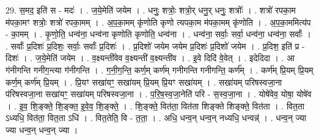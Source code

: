 \documentclass[17pt]{extarticle}
\begin{document}
29. स॒मद॒ इति॑ स - मदः॑ । . ज॒ये॒मेति॑ जयेम । . धनुः॒ शत्रोः॒ शत्रो॒र् धनु॒र् धनुः॒ शत्रोः᳚ । . शत्रो॑ रपका॒म म॑पका॒मꣳ शत्रोः॒ शत्रो॑ रपका॒मम् । . अ॒प॒का॒मम् कृ॑णोति कृणो त्यपका॒म म॑पका॒मम् कृ॑णोति । . अ॒प॒का॒ममित्य॑प - का॒मम् । . कृ॒णो॒ति॒ धन्व॑ना॒ धन्व॑ना कृणोति कृणोति॒ धन्व॑ना । . धन्व॑ना॒ सर्वाः॒ सर्वा॒ धन्व॑ना॒ धन्व॑ना॒ सर्वाः᳚ । . सर्वाः᳚ प्र॒दिशः॑ प्र॒दिशः॒ सर्वाः॒ सर्वाः᳚ प्र॒दिशः॑ । . प्र॒दिशो॑ जयेम जयेम प्र॒दिशः॑ प्र॒दिशो॑ जयेम । . प्र॒दिश॒ इति॑ प्र - दिशः॑ । . ज॒ये॒मेति॑ जयेम । . व॒क्ष्यन्ती॑वेव व॒क्ष्यन्ती॑ व॒क्ष्यन्ती॑व । . इ॒वे दिदि॑ वे॒वेत् । . इदेदिदा । . आ ग॑नीगन्ति गनीग॒न्त्या ग॑नीगन्ति । . ग॒नी॒ग॒न्ति॒ कर्ण॒म् कर्ण॑म् गनीगन्ति गनीगन्ति॒ कर्ण᳚म् । . कर्ण॑म् प्रि॒यम् प्रि॒यम् कर्ण॒म् कर्ण॑म् प्रि॒यम् । . प्रि॒यꣳ सखा॑यꣳ॒॒ सखा॑यम् प्रि॒यम् प्रि॒यꣳ सखा॑यम् । . सखा॑यम् परिषस्वजा॒ना प॑रिषस्वजा॒ना सखा॑यꣳ॒॒ सखा॑यम् परिषस्वजा॒ना । . प॒रि॒ष॒स्व॒जा॒नेति॑ परि - स॒स्व॒जा॒ना । . योषे॑वेव॒ योषा॒ योषे॑व । . इ॒व॒ शि॒ङ्क्ते॒ शि॒ङ्क्त॒ इ॒वे॒व॒ शि॒ङ्क्ते॒ । . शि॒ङ्क्ते॒ वित॑ता॒ वित॑ता शिङ्क्ते शिङ्क्ते॒ वित॑ता । . वित॒ता ऽध्यधि॒ वित॑ता॒ वित॒ता ऽधि॑ । . वित॒तेति॒ वि - त॒ता॒ । . अधि॒ धन्व॒न् धन्व॒न् नध्यधि॒ धन्वन्न्॑ । . धन्व॒न् ज्या ज्या धन्व॒न् धन्व॒न् ज्या । \newline
\end{document}
